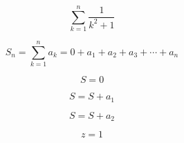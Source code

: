 \documentclass[b5paper]{article}
\begin{document}
$$\sum_{k=1}^{n}\frac{1}{k^{2}+1}$$

$$
S_{n}=\sum_{k=1}^{n}a_{k}=0+a_{1}+a_{2}+a_{3}+\cdots+a_{n}
$$

$$
S = 0
$$

$$
S= S+a_{1}
$$

$$
S=S+a_{2}
$$

$$z=1$$
$$

$$
\end{document}
